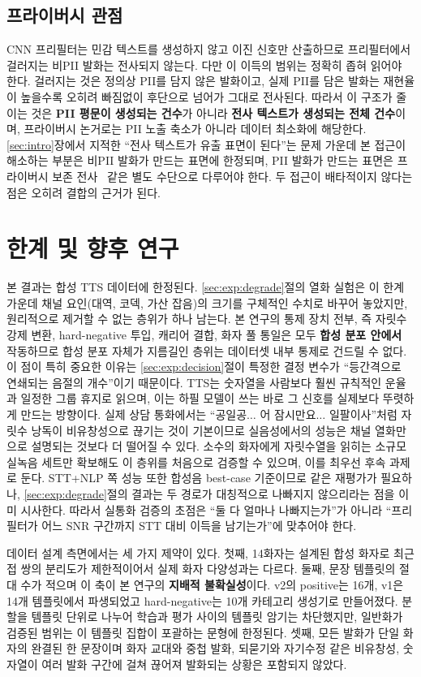 \documentclass[10pt,twocolumn]{article}
\renewcommand{\emph}[1]{\textbf{#1}}
\begin{document}
\subsection{프라이버시 관점}
CNN 프리필터는 민감 텍스트를 생성하지 않고 이진 신호만 산출하므로 프리필터에서 걸러지는 비PII
발화는 전사되지 않는다. 다만 이 이득의 범위는 정확히 좁혀 읽어야 한다. 걸러지는 것은 정의상
PII를 담지 않은 발화이고, 실제 PII를 담은 발화는 재현율이 높을수록 오히려 빠짐없이 후단으로
넘어가 그대로 전사된다. 따라서 이 구조가 줄이는 것은 \emph{PII 평문이 생성되는 건수}가 아니라
\emph{전사 텍스트가 생성되는 전체 건수}이며, 프라이버시 논거로는 PII 노출 축소가 아니라 데이터
최소화에 해당한다. \ref{sec:intro}장에서 지적한 ``전사 텍스트가 유출 표면이 된다''는 문제 가운데
본 접근이 해소하는 부분은 비PII 발화가 만드는 표면에 한정되며, PII 발화가 만드는 표면은
프라이버시 보존 전사~\cite{ahmed2020preech} 같은 별도 수단으로 다루어야 한다. 두 접근이
배타적이지 않다는 점은 오히려 결합의 근거가 된다.

\section{한계 및 향후 연구}\label{sec:limit}
본 결과는 합성 TTS 데이터에 한정된다. \ref{sec:exp:degrade}절의 열화 실험은 이 한계 가운데 채널
요인(대역, 코덱, 가산 잡음)의 크기를 구체적인 수치로 바꾸어 놓았지만, 원리적으로 제거할 수 없는
층위가 하나 남는다. 본 연구의 통제 장치 전부, 즉 자릿수 강제 변환, hard-negative 투입, 캐리어
결합, 화자 풀 통일은 모두 \emph{합성 분포 안에서} 작동하므로 합성 분포 자체가 지름길인 층위는
데이터셋 내부 통제로 건드릴 수 없다. 이 점이 특히 중요한 이유는 \ref{sec:exp:decision}절이 특정한
결정 변수가 ``등간격으로 연쇄되는 음절의 개수''이기 때문이다. TTS는 숫자열을 사람보다 훨씬
규칙적인 운율과 일정한 그룹 휴지로 읽으며, 이는 하필 모델이 쓰는 바로 그 신호를 실제보다
뚜렷하게 만드는 방향이다. 실제 상담 통화에서는 ``공일공$\ldots$ 어 잠시만요$\ldots$
일팔이사''처럼 자릿수 낭독이 비유창성으로 끊기는 것이 기본이므로 실음성에서의 성능은 채널
열화만으로 설명되는 것보다 더 떨어질 수 있다. 소수의 화자에게 자릿수열을 읽히는 소규모 실녹음
세트만 확보해도 이 층위를 처음으로 검증할 수 있으며, 이를 최우선 후속 과제로 둔다. STT+NLP 쪽
성능 또한 합성음 best-case 기준이므로 같은 재평가가 필요하나, \ref{sec:exp:degrade}절의 결과는
두 경로가 대칭적으로 나빠지지 않으리라는 점을 이미 시사한다. 따라서 실통화 검증의 초점은 ``둘 다
얼마나 나빠지는가''가 아니라 ``프리필터가 어느 SNR 구간까지 STT 대비 이득을 남기는가''에
맞추어야 한다.

데이터 설계 측면에서는 세 가지 제약이 있다. 첫째, 14화자는 설계된 합성 화자로 최근접 쌍의
분리도가 제한적이어서 실제 화자 다양성과는 다르다. 둘째, 문장 템플릿의 절대 수가 적으며 이 축이
본 연구의 \emph{지배적 불확실성}이다. v2의 positive는 16개, v1은 14개 템플릿에서 파생되었고
hard-negative는 10개 카테고리 생성기로 만들어졌다. 분할을 템플릿 단위로 나누어 학습과 평가 사이의
템플릿 암기는 차단했지만, 일반화가 검증된 범위는 이 템플릿 집합이 포괄하는 문형에 한정된다.
셋째, 모든 발화가 단일 화자의 완결된 한 문장이며 화자 교대와 중첩 발화, 되묻기와 자기수정 같은
비유창성, 숫자열이 여러 발화 구간에 걸쳐 끊어져 발화되는 상황은 포함되지 않았다.
\end{document}
